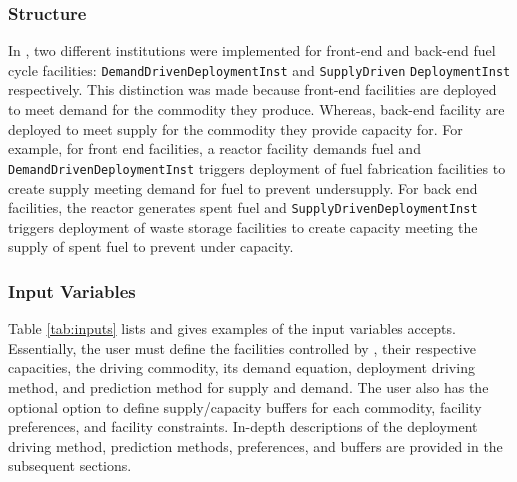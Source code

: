\subsubsection{\textbf{Structure}}
In \deploy, two different institutions were implemented for 
front-end and back-end fuel cycle facilities: 
\texttt{DemandDrivenDeploymentInst} and 
\texttt{SupplyDriven} 
\noindent
\texttt{DeploymentInst} respectively. 
This distinction was made because front-end facilities 
are deployed to meet demand for the commodity they produce. 
Whereas, back-end facility are deployed to meet supply for the 
commodity they provide capacity for. 
For example, for front end facilities, a reactor facility 
demands fuel and \texttt{DemandDrivenDeploymentInst} 
triggers deployment of fuel fabrication facilities to create 
supply meeting demand for fuel to prevent undersupply. 
For back end facilities, the reactor generates spent fuel and 
\texttt{SupplyDrivenDeploymentInst} triggers deployment of 
waste storage facilities to create capacity meeting the supply 
of spent fuel to prevent under capacity. 

\subsubsection{\textbf{Input Variables}}
Table \ref{tab:inputs} lists and gives examples of the input 
variables \deploy accepts. 
Essentially, the user must define the facilities controlled by 
\deploy, their respective capacities, the driving commodity, 
its demand equation, deployment driving method, and prediction method 
for supply and demand. 
The user also has the optional option to define supply/capacity buffers 
for each commodity, facility preferences, and facility constraints. 
In-depth descriptions of the deployment driving method, prediction 
methods, preferences, and buffers are provided in the subsequent sections. 

